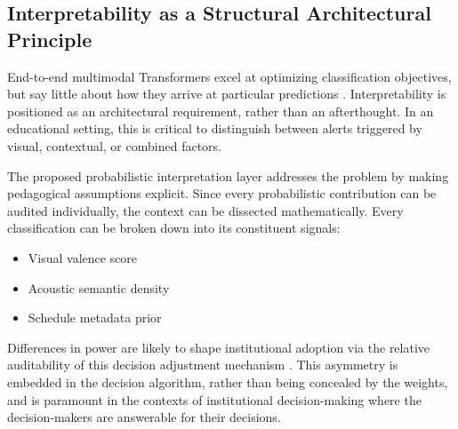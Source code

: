 \documentclass[conference]{IEEEtran}
\begin{document}
\subsection{Interpretability as a Structural Architectural Principle}
End-to-end multimodal Transformers excel at optimizing classification objectives, but say little about how they arrive at particular predictions \cite{b6}. Interpretability is positioned as an architectural requirement, rather than an afterthought. In an educational setting, this is critical to distinguish between alerts triggered by visual, contextual, or combined factors.

The proposed probabilistic interpretation layer addresses the problem by making pedagogical assumptions explicit. Since every probabilistic contribution can be audited individually, the context can be dissected mathematically. Every classification can be broken down into its constituent signals:
\begin{itemize}
    \item Visual valence score
    \item Acoustic semantic density
    \item Schedule metadata prior
\end{itemize}

Differences in power are likely to shape institutional adoption via the relative auditability of this decision adjustment mechanism \cite{b21}. This asymmetry is embedded in the decision algorithm, rather than being concealed by the weights, and is paramount in the contexts of institutional decision-making where the decision-makers are answerable for their decisions.

\end{document}
